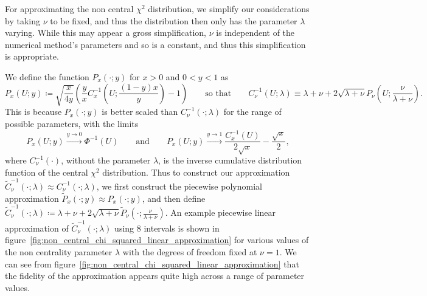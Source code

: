 \documentclass[manuscript,review]{acmart}
\begin{document}
For approximating the non central $ \chi^2 $ distribution, we simplify our considerations by taking $ \nu $ to be fixed, and thus the distribution then only has the parameter $ \lambda $ varying. While this may appear a gross simplification, $ \nu $ is independent of the numerical method's parameters and so is a constant, and thus this simplification is appropriate.

We define the function $ P_x(\cdot;y) $ for $ x > 0 $ and $ 0 < y < 1  $ as 
\begin{equation*}
P_x(U;y) \coloneqq \sqrt{\dfrac{x}{4y}} \left( \dfrac{y}{x}  C^{-1}_{x}\left(U; \dfrac{(1 - y)x}{y}\right) - 1\right)
\qquad \text{so that} \qquad 
C^{-1}_{\nu}(U;\lambda) \equiv \lambda + \nu + 2 \sqrt{\lambda + \nu} P_\nu\left(U;\dfrac{\nu}{\lambda + \nu}\right).
\end{equation*}
This is because $ P_x(\cdot;y) $ is better scaled than $ C^{-1}_{\nu}(\cdot;\lambda) $ for the range of possible parameters, with the limits
\begin{equation*}
P_x(U;y) \xrightarrow{y\to 0} \Phi^{-1}(U) 
\qquad \text{and} \qquad 
P_x(U;y) \xrightarrow{y\to 1} \dfrac{C^{-1}_x(U)}{2\sqrt{x}} - \dfrac{\sqrt{x}}{2},
\end{equation*}
where $ C^{-1}_\nu(\cdot) $, without the parameter $ \lambda $, is the inverse cumulative distribution function of the central $ \chi^2 $ distribution. Thus to construct our approximation $ \widetilde{C}^{-1}_{\nu}(\cdot;\lambda) \approx C^{-1}_{\nu}(\cdot;\lambda) $, we first construct the piecewise polynomial approximation $ \widetilde{P}_x(\cdot;y) \approx P_x(\cdot;y) $, and then define 
$ \widetilde{C}^{-1}_{\nu}(\cdot;\lambda) \coloneqq \lambda + \nu + 2 \sqrt{\lambda + \nu} \widetilde{P}_\nu(\cdot;\tfrac{\nu}{\lambda + \nu}) $. An example piecewise linear approximation of $  \widetilde{C}^{-1}_{\nu}(\cdot;\lambda) $ using 8 intervals is shown in figure~\ref{fig:non_central_chi_squared_linear_approximation} for various values of the non centrality parameter $ \lambda $ with the degrees of freedom fixed at $ \nu = 1 $. We can see from figure~\ref{fig:non_central_chi_squared_linear_approximation} that the fidelity of the approximation appears quite high across a range of parameter values. 
\end{document}
